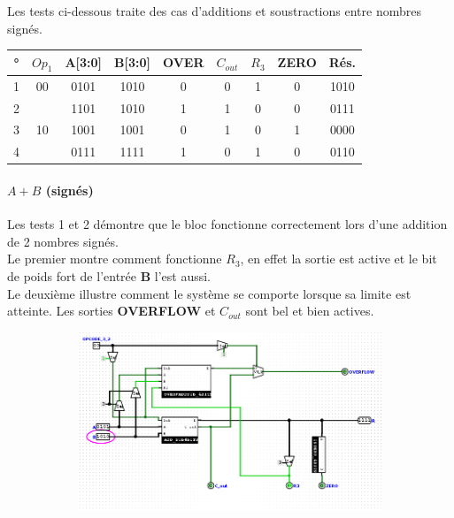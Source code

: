 \documentclass[a4paper]{article}
\begin{document}
\begin{tcolorbox}[colframe=Monokaimagenta,colback=white]
Les tests ci-dessous traite des cas d'additions et soustractions entre nombres signés.\\
\begin{center}


\begin{tabular}{|c|c|c|c||c|c|c|c|c|}
    \hline
     ° & $Op_1$ & A[3:0] & B[3:0] & OVER & $C_{out}$ & $R_3$ & ZERO & Rés. \\
    \hline
    1  & 00     & 0101   & 1010   & 0    &  0        &   1   &  0   & 1010\\
    2  &        & 1101   & 1010   & 1    &  1        &   0   &  0   & 0111 \\
    \hline
    3  & 10     & 1001   & 1001   & 0    &  1        &   0   &  1   & 0000\\
    4  &        & 0111   & 1111   & 1    &  0        &   1   &  0   & 0110\\
    \hline
    
\end{tabular}



\end{center}
\paragraph{$A+B$ (signés)}
Les tests 1 et 2 démontre que le bloc fonctionne correctement lors d'une addition de 2 nombres signés.\\
Le premier montre comment fonctionne $R_3$, en effet la sortie est active et le bit de poids fort de l'entrée \textbf{B} l'est aussi.\\
Le deuxième illustre comment le système se comporte lorsque sa limite est atteinte. Les sorties \textbf{OVERFLOW} et $C_{out}$ sont bel et bien actives.
\begin{figure}[H]
    \centering
    
    \begin{subfigure}{.7\textwidth}
        \centering
        \includegraphics[width=.8\linewidth]{src/ADDSUB_TEST_AplB.png}
        \label{fig:ex_moins_signes}
   \end{subfigure}
   

\end{figure}
\end{tcolorbox}
\end{document}
